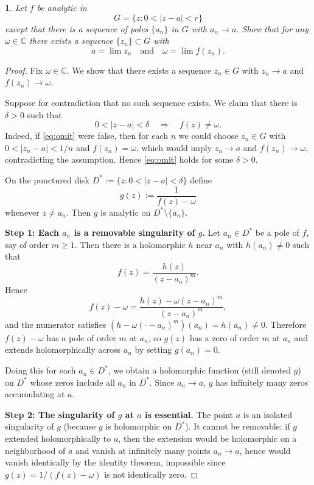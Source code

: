 \documentclass[12pt, a4paper]{report}
\theoremstyle{spaced}
\newtheorem{exercise}{}
\newcommand{\setexercise}[1]{\setcounter{exercise}{#1-1}}
\begin{document}
\setexercise{15}
\begin{exercise}
	Let \( f \) be analytic in
	\[
		G = \{ z : 0 < |z - a| < r \}
	\]
	except that there is a sequence of poles \( \{a_n\} \) in \(G\) with \(a_n \to a\).
	Show that for any \( \omega \in \mathbb{C} \) there exists a sequence \( \{z_n\} \subset G \) with
	\[
		a = \lim z_n \quad \text{and} \quad \omega = \lim f(z_n).
	\]
\end{exercise}

\begin{proof}
	Fix $\omega\in\mathbb C$. We show that there exists a sequence $z_n\in G$ with
	$z_n\to a$ and $f(z_n)\to\omega$.

	Suppose for contradiction that no such sequence exists. We claim that there is
	$\delta>0$ such that
	\begin{equation}\label{eq:omit}
		0<|z-a|<\delta \quad\Longrightarrow\quad f(z)\neq \omega .
	\end{equation}
	Indeed, if \eqref{eq:omit} were false, then for each $n$ we could choose
	$z_n\in G$ with $0<|z_n-a|<1/n$ and $f(z_n)=\omega$, which would imply
	$z_n\to a$ and $f(z_n)\to\omega$, contradicting the assumption. Hence
	\eqref{eq:omit} holds for some $\delta>0$.

	On the punctured disk $D^*:=\{z:0<|z-a|<\delta\}$ define
	\[
		g(z):=\frac1{f(z)-\omega}
	\]
	whenever $z\neq a_n$. Then $g$ is analytic on $D^*\setminus\{a_n\}$.

	\medskip
	\noindent\textbf{Step 1: Each $a_n$ is a removable singularity of $g$.}
	Let $a_n\in D^*$ be a pole of $f$, say of order $m\ge1$. Then there is a
	holomorphic $h$ near $a_n$ with $h(a_n)\neq0$ such that
	\[
		f(z)=\frac{h(z)}{(z-a_n)^m}.
	\]
	Hence
	\[
		f(z)-\omega=\frac{h(z)-\omega(z-a_n)^m}{(z-a_n)^m},
	\]
	and the numerator satisfies $(h-\omega(\cdot-a_n)^m)(a_n)=h(a_n)\neq0$.
	Therefore $f(z)-\omega$ has a pole of order $m$ at $a_n$, so $g(z)$ has a zero
	of order $m$ at $a_n$ and extends holomorphically across $a_n$ by setting
	$g(a_n)=0$.

	Doing this for each $a_n\in D^*$, we obtain a holomorphic function (still
	denoted $g$) on $D^*$ whose zeros include all $a_n$ in $D^*$. Since $a_n\to a$,
	$g$ has infinitely many zeros accumulating at $a$.

	\medskip
	\noindent\textbf{Step 2: The singularity of $g$ at $a$ is essential.}
	The point $a$ is an isolated singularity of $g$ (because $g$ is holomorphic on
	$D^*$). It cannot be removable: if $g$ extended holomorphically to $a$, then
	the extension would be holomorphic on a neighborhood of $a$ and vanish at
	infinitely many points $a_n\to a$, hence would vanish identically by the
	identity theorem, impossible since $g(z)=1/(f(z)-\omega)$ is not identically
	zero.


\end{proof}
\end{document}
